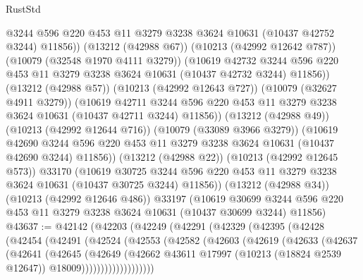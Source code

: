 \begin{lexlean}{RustStd}
\begin{coremodule}
                @3244
                @596
                @220
                @453
                @11
                @3279
                @3238
                @3624
                @10631
                (@10437 @42752 @3244)
                @11856))
            (@13212 (@42988 @67))
            (@10213 (@42992 @12642 @787))
            (@10079 (@32548 @1970 @4111 @3279))
            (@10619
              @42732
              @3244
              @596
              @220
              @453
              @11
              @3279
              @3238
              @3624
              @10631
              (@10437 @42732 @3244)
              @11856))
          (@13212 (@42988 @57))
          (@10213 (@42992 @12643 @727))
          (@10079 (@32627 @4911 @3279))
          (@10619
            @42711
            @3244
            @596
            @220
            @453
            @11
            @3279
            @3238
            @3624
            @10631
            (@10437 @42711 @3244)
            @11856))
        (@13212 (@42988 @49))
        (@10213 (@42992 @12644 @716))
        (@10079 (@33089 @3966 @3279))
        (@10619
          @42690
          @3244
          @596
          @220
          @453
          @11
          @3279
          @3238
          @3624
          @10631
          (@10437 @42690 @3244)
          @11856))
      (@13212 (@42988 @22))
      (@10213 (@42992 @12645 @573))
      @33170
      (@10619
        @30725
        @3244
        @596
        @220
        @453
        @11
        @3279
        @3238
        @3624
        @10631
        (@10437 @30725 @3244)
        @11856))
    (@13212 (@42988 @34))
    (@10213 (@42992 @12646 @486))
    @33197
    (@10619 @30699 @3244 @596 @220 @453 @11 @3279 @3238 @3624 @10631 (@10437 @30699 @3244) @11856)
@43637 := @42142
    (@42203
      (@42249
        (@42291
          (@42329
            (@42395
              (@42428
                (@42454
                  (@42491
                    (@42524
                      (@42553
                        (@42582
                          (@42603
                            (@42619
                              (@42633
                                (@42637
                                  (@42641
                                    (@42645
                                      (@42649
                                        (@42662
                                          @43611
                                          @17997
                                          (@10213 (@18824 @2539 @12647))
                                          @18009)))))))))))))))))))

\end{coremodule}
\end{lexlean}
